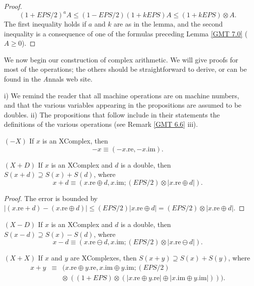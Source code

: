 \begin{proof}{} 
$$(1 + EPS/2)^a A\le (1 - EPS/2)(1 + k EPS) A \le (1 + k EPS) \otimes A.$$ 
The first inequality holds if $a$ and $k$ are as in the lemma, and the second inequality is a consequence of one of the
formulas preceding Lemma \ref{GMT 7.0} ($A \ge 0$). \end{proof}
 
We now begin our construction of complex arithmetic. We will give proofs for most of the operations; the others should be straightforward to derive,
or can be found in the {\textit Annals} web site.
\begin{remarks} \label{GMT 7.5}
i) We remind the reader that all machine operations are on machine numbers, and that the various variables appearing in the propositions are assumed to be doubles.
ii) The propositions that follow include in their statements the definitions of the various operations (see Remark \ref{GMT 6.6} iii).\end{remarks}

\begin{proposition}\label{GMT prop7.1}{$(-X)$}
If $x$ is an {\textrm XComplex,} then 
$$-x \equiv (-x.\mathrm {re},-x.\mathrm {im}).$$ 
\end{proposition}

\begin{proposition}\label{GMT prop7.2}{$(X + D)$} 
If $x$ is an {\textrm XComplex} and $d$ is a double{\textrm ,} then 
$S(x + d) \supseteq S(x) + S(d)${\textrm ,} where 
 $$x + d \equiv (x.\mathrm {re} \oplus d, x.\mathrm {im};
(EPS/2)\otimes |x.\mathrm {re} \oplus d|).$$
\end{proposition}

\begin{proof}{}
The  error is bounded by  
\hfill ${\displaystyle |(x.\mathrm {re} + d) - (x.\mathrm {re} \oplus d)|
\le (EPS/2) | x.\mathrm {re} \oplus d|
  =  (EPS/2) \otimes | x.\mathrm {re} \oplus d|.}$ \end{proof}

\begin{proposition}\label{GMT prop7.3}{$(X - D)$}
If $x$ is an {\textrm XComplex} and $d$ is a double{\textrm ,} then 
$S(x - d) \supseteq S(x) - S(d)${\textrm ,} where 
 $$x - d \equiv (x.\mathrm {re} \ominus d, x.\mathrm {im};
(EPS/2)\otimes |x.\mathrm {re} \ominus d|).$$ \end{proposition}

\begin{proposition}\label{GMT prop7.4}{$(X + X)$}
If $x$ and $y$ are {\textrm XComplexes,} then 
$S(x + y) \supseteq S(x) + S(y)${\textrm ,} where
 \begin{eqnarray*}
x + y &\equiv& (x.\mathrm {re} \oplus y.\mathrm {re}, x.\mathrm {im} \oplus y.\mathrm {im};
(EPS/2)\\
&&  \otimes\ ((1 + EPS)  \otimes (|x.\mathrm {re} \oplus y.\mathrm {re}| \oplus |x.\mathrm {im} \oplus y.\mathrm {im}|))).
\end{eqnarray*}
\end{proposition}
  

